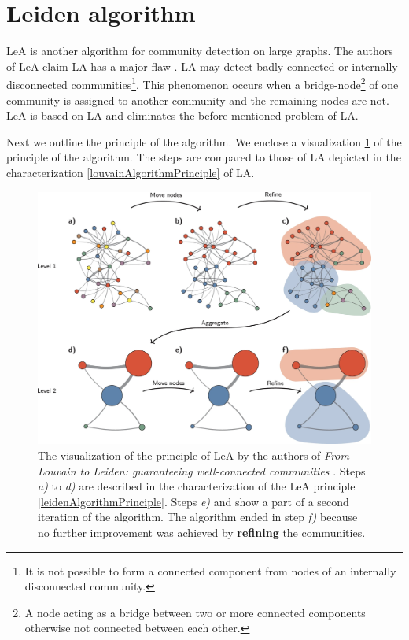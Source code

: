 \section{Leiden algorithm} \label{leidenAlgorithm}
 LeA is another algorithm for community detection on large graphs. The authors of LeA claim LA has a major flaw \cite{leidenAlgorithm}. LA may detect badly connected or internally disconnected communities\footnote{It is not possible to form a connected component from nodes of an internally disconnected community.}. This phenomenon occurs when a bridge-node\footnote{A node acting as a bridge between two or more connected components otherwise not connected between each other.} of one community is assigned to another community and the remaining nodes are not. LeA is based on LA and eliminates the before mentioned problem of LA. 

Next we outline the principle of the algorithm. We enclose a visualization \ref{leidenVisualization} \cite{leidenVisualization} of the principle of the algorithm. The steps are compared to those of LA depicted in the characterization \ref{louvainAlgorithmPrinciple} of LA. 
\begin{figure}[ht!]
  \centering
  \includegraphics[width=\textwidth]{Images/leidenVisualization.png}
  \caption{The visualization of the principle of LeA \cite{leidenVisualization} by the authors of \textit{From Louvain to Leiden: guaranteeing well-connected communities} \cite{leidenAlgorithm}. Steps \textit{a)} to \textit{d)} are described in the characterization of the LeA principle \ref{leidenAlgorithmPrinciple}. Steps \textit{e)} and  show a part of a second iteration of the algorithm. The algorithm ended in step \textit{f)} because no further improvement was achieved by \textbf{refining} the communities.}
  \label{leidenVisualization}
\end{figure}    
 
